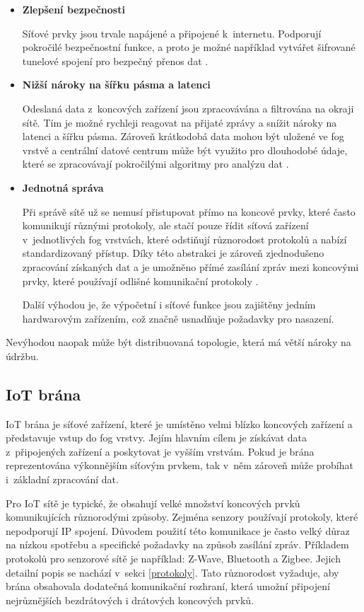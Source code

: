  \begin{itemize}
 \item \textbf{Zlepšení bezpečnosti} 
 
     Síťové prvky jsou trvale napájené a připojené k internetu. Podporují pokročilé
     bezpečnostní funkce, a proto je možné například vytvářet šifrované tunelové
     spojení pro bezpečný přenos dat \cite{fog}.     
\item \textbf{Nižší nároky na šířku pásma a latenci} 

    Odeslaná data z~koncových zařízení jsou zpracovávána a filtrována na okraji 
    sítě. Tím je možné rychleji reagovat na přijaté zprávy a snížit nároky
    na latenci a šířku pásma. Zároveň krátkodobá data mohou být uložené ve 
    fog vrstvě a centrální datové centrum může být využito pro dlouhodobé údaje, 
    které se zpracovávají pokročilými algoritmy pro analýzu dat \cite{fog}.
 \item \textbf{Jednotná správa} 
 
    Při správě sítě už se nemusí přistupovat přímo na koncové prvky, které 
    často komunikují různými protokoly, ale stačí pouze
    řídit síťová zařízení v~jednotlivých fog vrstvách, které odstiňují různorodost
    protokolů a nabízí standardizovaný přístup. Díky této abstrakci je 
    zároveň zjednodušeno zpracování získaných dat a je umožněno přímé zasílání zpráv
    mezi koncovými prvky, které používají odlišné komunikační protokoly \cite{fog}.
    
    Další výhodou je, že výpočetní i síťové funkce jsou zajištěny jedním hardwarovým
    zařízením, což značně usnadňuje požadavky pro nasazení.
 \end{itemize} 
 
 Nevýhodou naopak může být distribuovaná topologie, která má větší nároky na údržbu.
 
 \subsection{IoT brána} 
 IoT brána je síťové zařízení, které je umístěno velmi blízko koncových zařízení
 a představuje vstup do fog vrstvy. Jejím hlavním cílem je získávat data 
 z~připojených zařízení a poskytovat je vyšším vrstvám. Pokud je brána reprezentována
 výkonnějším síťovým prvkem, tak v~něm zároveň může probíhat i~základní zpracování
 dat. 
 
 Pro IoT sítě je typické, že obsahují velké množství koncových prvků komunikujících
 různorodými způsoby. Zejména senzory používají protokoly, které nepodporují
 IP spojení. Důvodem použití této komunikace je často velký
 důraz na nízkou spotřebu a specifické požadavky na způsob zasílání zpráv.
 Příkladem protokolů pro senzorové sítě je například:
 Z-Wave, Bluetooth a Zigbee. Jejich detailní popis se nachází v~sekci 
 \ref{protokoly}.
 Tato různorodost vyžaduje, aby brána obsahovala dodatečná komunikační rozhraní, která 
 umožní připojení nejrůznějších bezdrátových i drátových koncových prvků. 
 
